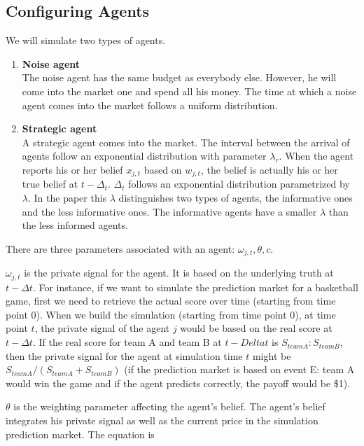\documentclass{article}
\begin{document}
        \subsection{Configuring Agents}
        We will simulate two types of agents.
        \begin{enumerate}
    \item \textbf{Noise agent}\\
    The noise agent has the same budget as everybody else. However, he will come into the market one and spend all his money. The time at which a noise agent comes into the market follows a uniform distribution.
    \item \textbf{Strategic  agent}\\
    A strategic agent comes into the market. The interval between the arrival of agents follow an exponential distribution with parameter $\lambda_r$. When the agent reports his or her belief $x_{j,t}$ based on $w_{j,t}$, the belief is actually his or her true belief at $t-\Delta_t$. $\Delta_t$ follows an exponential distribution parametrized by $\lambda$. In the paper this $\lambda$ distinguishes two types of agents, the informative ones and the less informative ones. The informative agents have a smaller $\lambda$ than the less informed agents.
    
\end{enumerate}
        There are three parameters associated with an agent: $\omega_{j,t},\theta,c$.
        
        $\omega_{j,t}$ is the private signal for the agent. It is based on the underlying truth at $t-\Delta t$. For instance, if we want to simulate the prediction market for a basketball game, first we need to retrieve the actual score over time (starting from time point $0$). When we build the simulation (starting from time point $0$), at time point $t$, the private signal of the agent $j$ would be based on the real score at $t-\Delta t$. If the real score for team A and team B at $t-Delta t$ is $S_{team A}:S_{team B}$, then the private signal for the agent at simulation time $t$ might be $S_{team A}/(S_{team A}+S_{team B})$ (if the prediction market is based on event E: team A would win the game and if the agent predicts correctly, the payoff would be \$1).
        
        $\theta$ is the weighting parameter affecting the agent's belief. The agent's belief integrates his private signal as well as the current price in the simulation prediction market. The equation is
        
\end{document}
